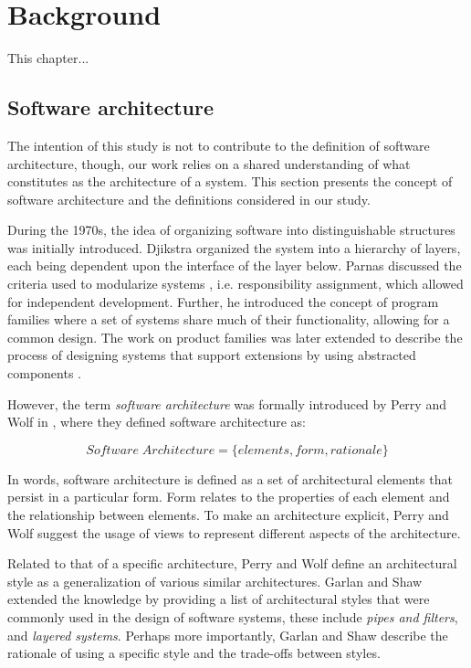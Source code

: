 \chapter{Background}

This chapter...

\section{Software architecture}
The intention of this study is not to contribute to the definition of software architecture, though, our work relies on a shared understanding of what constitutes as the architecture of a system. This section presents the concept of software architecture and the definitions considered in our study.   

During the 1970s,  the idea of organizing software into distinguishable structures was initially introduced. Djikstra \cite{dijkstra_structure_1968} organized the system into a hierarchy of layers, each being dependent upon the interface of the layer below. Parnas discussed the criteria used to modularize systems \cite{broy_criteria_1972}, i.e. responsibility assignment, which allowed for independent development. Further, he introduced the concept of program families \cite{parnas_design_1976} where a set of systems share much of their functionality, allowing for a common design. The work on product families was later extended to describe the process of designing systems that support extensions by using abstracted components \cite{parnas_designing_1979}. 

However, the term \textit{software architecture} was formally introduced by Perry and Wolf in \cite{perry_foundations_1992}, where they defined software architecture as:

\[ Software \;  Architecture = \{elements,form,rationale\} \]

In words, software architecture is defined as a set of architectural elements that persist in a particular form. Form relates to the properties of each element and the relationship between elements. To make an architecture explicit, Perry and Wolf \cite{perry_foundations_1992} suggest the usage of views to represent different aspects of the architecture. 

Related to that of a specific architecture, Perry and Wolf \cite{perry_foundations_1992} define an architectural style as a generalization of various similar architectures. Garlan and Shaw \cite{ambriola_introduction_1993} extended the knowledge by providing a list of architectural styles that were commonly used in the design of software systems, these include \textit{pipes and filters}, and \textit{layered systems}. Perhaps more importantly, Garlan and Shaw \cite{ambriola_introduction_1993} describe the rationale of using a specific style and the trade-offs between styles.

